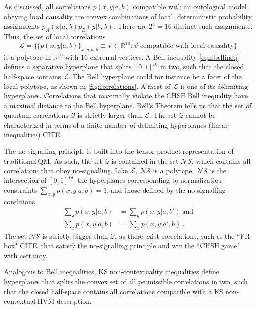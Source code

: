 As discussed, all correlations $p(x,y\vert a,b)$ compatible with an ontological model obeying local causality are convex combinations of local, deterministic probability assignments $p_A(x \vert a,\lambda)p_B(y \vert b,\lambda)$. There are $2^4=16$ distinct such assignments. Thus, the set of local correlations 
\begin{equation}
\mathcal{L} =\{\{p(x,y\vert a,b)\}_{x,y,a,b}\equiv \vec{v}\in\mathbb{R}^{16}: \vec{v}\; \text{compatible with local causality}\}
\end{equation}
is a polytope in $\mathbb{R}^{16}$ with 16 extremal vertices. A Bell inequality \ref{eqn:bellineq} defines a separative hyperplane that splits $[0,1]^{16}$ in two, such that the closed half-space contains $\mathcal{L}$. The Bell hyperplane could for instance be a facet of the local polytope, as shown in \ref{fig:correlations}. A facet of $\mathcal{L}$ is one of its delimiting hyperplanes. Correlations that maximally violate the CHSH Bell inequality have a maximal distance to the Bell hyperplane. Bell's Theorem tells us that the set of quantum correlations $\mathcal{Q}$ is strictly larger than $\mathcal{L}$. The set $\mathcal{Q}$ cannot be characterized in terms of a finite number of delimiting hyperplanes (linear inequalities) CITE. 

The no-signalling principle is built into the tensor product representation of traditional QM. As such, the set $\mathcal{Q}$ is contained in the set $\mathcal{NS}$, which contains all correlations that obey no-signalling. Like $\mathcal{L}$, $\mathcal{NS}$ is a polytope: $\mathcal{NS}$ is the intersection of $[0,1]^{16}$, the hyperplanes corresponding to normalization constraints $\sum_{x,y} p(x,y\vert a,b)=1$, and those defined by the no-signalling conditions
\begin{align}
\sum_y p(x,y\vert a,b) & = \sum_y p(x,y\vert a,b') \; \text{and} \\
\sum_x p(x,y\vert a,b) & = \sum_x p(x,y\vert a',b)\;.
\end{align}
The set $\mathcal{NS}$ is strictly bigger than $\mathcal{Q}$, as there exist correlations, such as the ``PR-box" CITE, that satisfy the no-signalling principle and win the ``CHSH game" with certainty.

Analogous to Bell inequalities, KS non-contextuality inequalities define hyperplanes that splits the convex set of all permissible correlations in two, such that the closed half-space contains all correlations compatible with a KS non-contextual HVM description.

